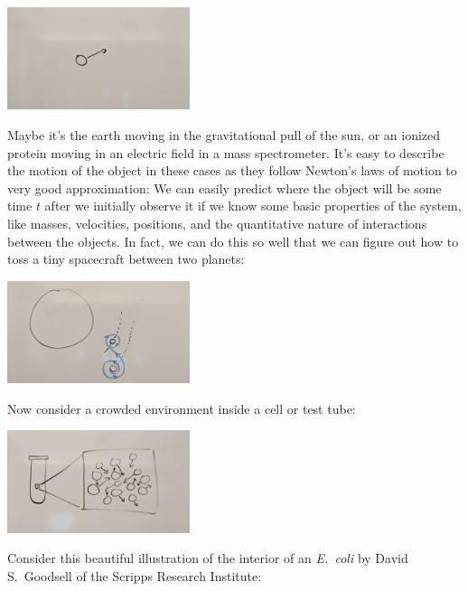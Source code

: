 \documentclass[english,course]{lecture}
\begin{document}
\begin{centering}
\includegraphics[width=0.4\textwidth]{figures/single-particle.jpg}

\end{centering}

Maybe it's the earth moving in the gravitational pull of the sun, or an ionized protein moving in an electric field in a mass spectrometer.
It's easy to describe the motion of the object in these cases as they follow Newton's laws of motion to very good approximation: We can easily predict where the object will be some time $t$ after we initially observe it if we know some basic properties of the system, like masses, velocities, positions, and the quantitative nature of interactions between the objects.
In fact, we can do this so well that we can figure out how to toss a tiny spacecraft between two planets:

\begin{centering}
\includegraphics[width=0.4\textwidth]{figures/spacecraft-trajectory.jpg}

\end{centering}

Now consider a crowded environment inside a cell or test tube: 

\begin{centering}
\includegraphics[width=0.4\textwidth]{figures/many-particles.jpg}

\end{centering}

Consider this beautiful illustration of the interior of an \emph{E.~coli} by David S.\ Goodsell of the Scripps Research Institute:
\end{document}
